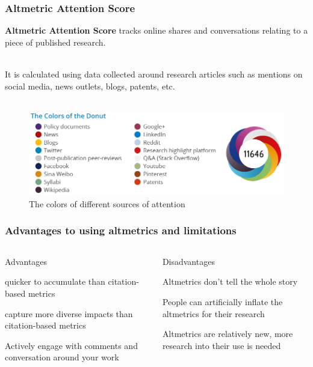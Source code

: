 \documentclass{beamer}
\begin{document}
\begin{frame}
    \frametitle{Altmetric Attention Score}

    \textbf{Altmetric Attention Score} tracks online shares and conversations relating to a piece of published research. \\~\

     It is calculated using data collected around research articles such as mentions on social media, news outlets, blogs, patents, etc.\\~\

    \begin{figure}[h]
        \includegraphics[height=0.41\textheight]{2.png}
        \caption{The colors of different sources of attention}
    \end{figure}
\end{frame}
\begin{frame}
    \frametitle{Advantages to using altmetrics and limitations}
    \begin{columns}[T]
        \begin{column}{.5\textwidth} \pause
            \centering Advantages 
            \begin{propslist}
                \item quicker to accumulate than citation-based metrics  \pause
                \item capture more diverse impacts than citation-based metrics \pause              
                \item Actively engage with comments and conversation around your work \pause
            \end{propslist}
        \end{column}
        \begin{column}{.5\textwidth}
            \centering Disadvantages %
            \begin{conslist}
                \item Altmetrics don’t tell the whole story \pause
                \item People can artificially inflate the altmetrics for their research \pause
                \item Altmetrics are relatively new, more research into their use is needed  \pause
            \end{conslist}
        \end{column}
    \end{columns}
\end{frame}
\end{document}
